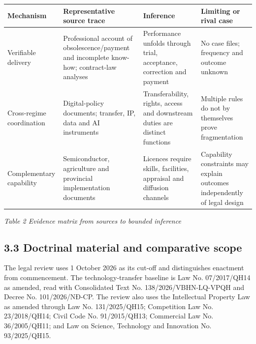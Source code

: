 \documentclass[
]{article}
\newcounter{none} %
\begin{document}
{\def\LTcaptype{none} %
\begin{longtable}[]{@{}
  >{\raggedright\arraybackslash}p{}
  >{\raggedright\arraybackslash}p{}
  >{\raggedright\arraybackslash}p{}
  >{\raggedright\arraybackslash}p{}@{}}
\toprule\noalign{}
\begin{minipage}[b]{\linewidth}\centering
\textbf{Mechanism}
\end{minipage} & \begin{minipage}[b]{\linewidth}\centering
\textbf{Representative source trace}
\end{minipage} & \begin{minipage}[b]{\linewidth}\centering
\textbf{Inference}
\end{minipage} & \begin{minipage}[b]{\linewidth}\centering
\textbf{Limiting or rival case}
\end{minipage} \\
\midrule\noalign{}
\endhead
\bottomrule\noalign{}
\endlastfoot
Verifiable delivery & Professional account of obsolescence/payment and
incomplete know-how; contract-law analyses & Performance unfolds through
trial, acceptance, correction and payment & No case files; frequency and
outcome unknown \\
Cross-regime coordination & Digital-policy documents; transfer, IP, data
and AI instruments & Transferability, rights, access and downstream
duties are distinct functions & Multiple rules do not by themselves
prove fragmentation \\
Complementary capability & Semiconductor, agriculture and provincial
implementation documents & Licences require skills, facilities,
appraisal and diffusion channels & Capability constraints may explain
outcomes independently of legal design \\
\end{longtable}
}

\emph{Table 2 Evidence matrix from sources to bounded inference}

\subsection{3.3 Doctrinal material and comparative
scope}\label{doctrinal-material-and-comparative-scope}

The legal review uses 1 October 2026 as its cut-off and distinguishes
enactment from commencement. The technology-transfer baseline is Law No.
07/2017/QH14 as amended, read with Consolidated Text No.
138/2026/VBHN-LQ-VPQH and Decree No. 101/2026/NĐ-CP. The review also
uses the Intellectual Property Law as amended through Law No.
131/2025/QH15; Competition Law No. 23/2018/QH14; Civil Code No.
91/2015/QH13; Commercial Law No. 36/2005/QH11; and Law on Science,
Technology and Innovation No. 93/2025/QH15.
\end{document}
